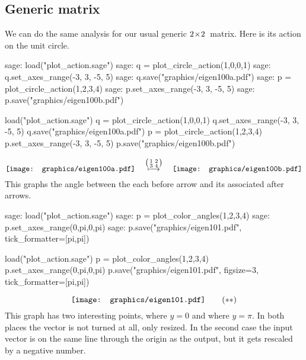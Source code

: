 \subsection{Generic matrix}
We can do the same analysis for our usual generic $2 \! \times \! 2$~matrix.
Here is its action on the unit circle.
\begin{sagecommandline}
sage: load("plot_action.sage")
sage: q = plot_circle_action(1,0,0,1) 
sage: q.set_axes_range(-3, 3, -5, 5) 
sage: q.save("graphics/eigen100a.pdf")
sage: p = plot_circle_action(1,2,3,4) 
sage: p.set_axes_range(-3, 3, -5, 5) 
sage: p.save("graphics/eigen100b.pdf")
\end{sagecommandline}
\begin{sagesilent}
load("plot_action.sage")
q = plot_circle_action(1,0,0,1) 
q.set_axes_range(-3, 3, -5, 5) 
q.save("graphics/eigen100a.pdf")
p = plot_circle_action(1,2,3,4) 
p.set_axes_range(-3, 3, -5, 5) 
p.save("graphics/eigen100b.pdf")
\end{sagesilent}
\begin{equation*}
  \vcenteredhbox{\texttt{[image: graphics/eigen100a.pdf]}}
  \quad\mapsunder{\big (\begin{smallmatrix} 1 &2 \\ 3 &4 \end{smallmatrix}\big )}\quad
  \vcenteredhbox{\texttt{[image: graphics/eigen100b.pdf]}}
\end{equation*}
This graphs the angle between the each before arrow and its associated after
arrows.
\begin{sagecommandline}
sage: load("plot_action.sage")  
sage: p = plot_color_angles(1,2,3,4)
sage: p.set_axes_range(0,pi,0,pi)
sage: p.save("graphics/eigen101.pdf", tick_formatter=[pi,pi])
\end{sagecommandline}
\begin{sagesilent}
load("plot_action.sage")  
p = plot_color_angles(1,2,3,4)
p.set_axes_range(0,pi,0,pi)
p.save("graphics/eigen101.pdf", figsize=3, tick_formatter=[pi,pi])
\end{sagesilent}
\begin{equation*}
  \vcenteredhbox{\texttt{[image: graphics/eigen101.pdf]}}
  \tag{$**$}
\end{equation*}
This graph has two interesting points, where $y=0$ and where 
$y=\pi$.
In both places the vector is not turned at all, only resized.
In the second case
the input vector is on the
same line through the origin as the output,
but it gets rescaled by a negative number.

